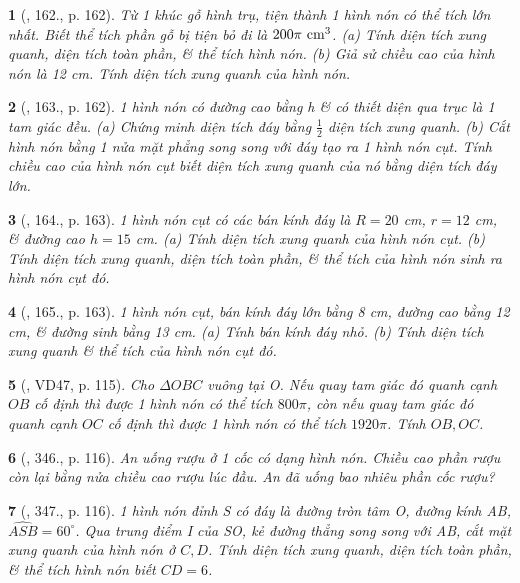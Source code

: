 \documentclass{article}
\newtheorem{baitoan}{}
\begin{document}
\begin{baitoan}[\cite{Tuyen_Toan_9_old}, 162., p. 162]
	Từ 1 khúc gỗ hình trụ, tiện thành 1 hình nón có thể tích lớn nhất. Biết thể tích phần gỗ bị tiện bỏ đi là $200\pi\ {\rm cm}^3$. (a) Tính diện tích xung quanh, diện tích toàn phần, \& thể tích hình nón. (b) Giả sử chiều cao của hình nón là {\rm12 cm}. Tính diện tích xung quanh của hình nón.
\end{baitoan}

\begin{baitoan}[\cite{Tuyen_Toan_9_old}, 163., p. 162]
	1 hình nón có đường cao bằng h \& có thiết diện qua trục là 1 tam giác đều. (a) Chứng minh diện tích đáy bằng $\frac{1}{2}$ diện tích xung quanh. (b) Cắt hình nón bằng 1 nửa mặt phẳng song song với đáy tạo ra 1 hình nón cụt. Tính chiều cao của hình nón cụt biết diện tích xung quanh của nó bằng diện tích đáy lớn.
\end{baitoan}

\begin{baitoan}[\cite{Tuyen_Toan_9_old}, 164., p. 163]
	1 hình nón cụt có các bán kính đáy là $R = 20$ {\rm cm}, $r = 12$ {\rm cm}, \& đường cao $h = 15$ {\rm cm}. (a) Tính diện tích xung quanh của hình nón cụt. (b) Tính diện tích xung quanh, diện tích toàn phần, \& thể tích của hình nón sinh ra hình nón cụt đó.
\end{baitoan}

\begin{baitoan}[\cite{Tuyen_Toan_9_old}, 165., p. 163]
	1 hình nón cụt, bán kính đáy lớn bằng {\rm8 cm}, đường cao bằng {\rm12 cm}, \& đường sinh bằng {\rm13 cm}. (a) Tính bán kính đáy nhỏ. (b) Tính diện tích xung quanh \& thể tích của hình nón cụt đó.
\end{baitoan}

\begin{baitoan}[\cite{Binh_Toan_9_tap_2}, VD47, p. 115]
	Cho $\Delta OBC$ vuông tại O. Nếu quay tam giác đó quanh cạnh $OB$ cố định thì được 1 hình nón có thể tích $800\pi$, còn nếu quay tam giác đó quanh cạnh $OC$ cố định thì được 1 hình nón có thể tích $1920\pi$. Tính $OB,OC$.
\end{baitoan}

\begin{baitoan}[\cite{Binh_Toan_9_tap_2}, 346., p. 116]
	An uống rượu ở 1 cốc có dạng hình nón. Chiều cao phần rượu còn lại bằng nửa chiều cao rượu lúc đầu. An đã uống bao nhiêu phần cốc rượu?
\end{baitoan}

\begin{baitoan}[\cite{Binh_Toan_9_tap_2}, 347., p. 116]
	1 hình nón đỉnh S có đáy là đường tròn tâm O, đường kính AB, $\widehat{ASB} = 60^\circ$. Qua trung điểm I của SO, kẻ đường thẳng song song với AB, cắt mặt xung quanh của hình nón ở $C,D$. Tính diện tích xung quanh, diện tích toàn phần, \& thể tích hình nón biết $CD = 6$.
\end{baitoan}
\end{document}
